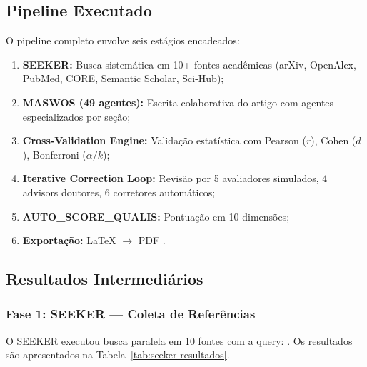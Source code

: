 \subsection{Pipeline Executado}

O pipeline completo envolve seis estágios encadeados:

\begin{enumerate}
    \item \textbf{SEEKER:} Busca sistemática em 10+ fontes acadêmicas
          (arXiv, OpenAlex, PubMed, CORE, Semantic Scholar, Sci-Hub);
    \item \textbf{MASWOS (49 agentes):} Escrita colaborativa do artigo
          com agentes especializados por seção;
    \item \textbf{Cross-Validation Engine:} Validação estatística com
          Pearson ($r$), Cohen ($d$), Bonferroni ($\alpha/k$);
    \item \textbf{Iterative Correction Loop:} Revisão por 5 avaliadores
          simulados, 4 advisors doutores, 6 corretores automáticos;
    \item \textbf{AUTO\_SCORE\_QUALIS:} Pontuação em 10 dimensões;
    \item \textbf{Exportação:} LaTeX $\rightarrow$ PDF \qualisA{}.
\end{enumerate}

\subsection{Resultados Intermediários}

\subsubsection{Fase 1: SEEKER --- Coleta de Referências}

O SEEKER executou busca paralela em 10 fontes com a query:
. Os resultados são apresentados na
Tabela~\ref{tab:seeker-resultados}.

\begin{table}[htb]
\centering
\caption{Resultados da busca do SEEKER por fonte}
\label{tab:seeker-resultados}
\small
\end{table}

